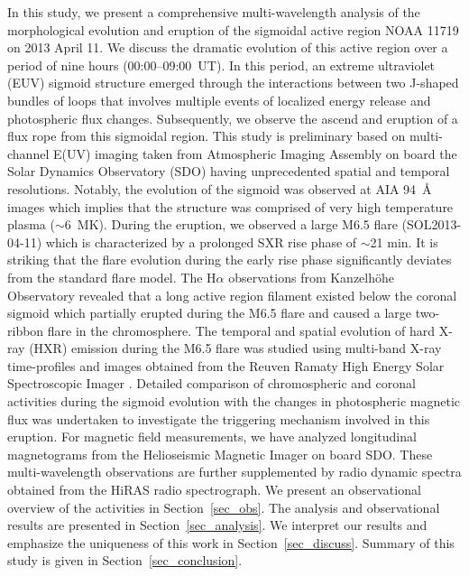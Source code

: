 \documentclass[twocolumn]{aastex6}
\begin{document}
In this study, we present a comprehensive multi-wavelength analysis of the morphological evolution and eruption of the sigmoidal active region NOAA 11719 on 2013 April 11. We discuss the dramatic evolution of this active region over a period of nine hours (00:00--09:00~UT). In this period, an extreme ultraviolet (EUV) sigmoid structure emerged through the interactions between two J-shaped bundles of loops that involves multiple events of localized energy release and photospheric flux changes. Subsequently, we observe the ascend and eruption of a flux rope from this sigmoidal region. This study is preliminary based on multi-channel E(UV) imaging taken from Atmospheric Imaging Assembly \citep[AIA;][]{Lemen2012} on board the Solar Dynamics Observatory (SDO) having unprecedented spatial and temporal resolutions. Notably, the evolution of the sigmoid was observed at AIA 94~\AA~ images which implies that the structure was comprised of very high temperature plasma ($\sim$6~MK). During the eruption, we observed a large M6.5 flare (SOL2013-04-11) which is characterized by a prolonged SXR rise phase of $\sim$21 min. It is striking that the flare evolution during the early rise phase significantly deviates from the standard flare model. The H$\alpha$ observations from Kanzelh\"{o}he Observatory \citep[KSO;][]{Potzi2015} revealed that a long active region filament existed below the coronal sigmoid which partially erupted during the M6.5 flare and caused a large two-ribbon flare in the chromosphere. The temporal and spatial evolution of hard X-ray (HXR) emission during the M6.5 flare was studied using multi-band X-ray time-profiles and images obtained from the Reuven Ramaty High Energy Solar Spectroscopic Imager \citep[RHESSI;][]{LinRP2002}. Detailed comparison of chromospheric and coronal activities during the sigmoid evolution with the changes in photospheric magnetic flux was undertaken to investigate the triggering mechanism involved in  this eruption. For magnetic field measurements, we have analyzed longitudinal magnetograms from the Helioseismic Magnetic Imager \citep[HMI;][]{Schou2012} on board SDO. These multi-wavelength observations are further supplemented by radio dynamic spectra obtained from the HiRAS radio spectrograph. We present an observational overview of the activities in Section~\ref{sec_obs}. The analysis and observational results are presented in Section~\ref{sec_analysis}. We interpret our results and emphasize the uniqueness of this work in Section~\ref{sec_discuss}. Summary of this study is given in Section~\ref{sec_conclusion}. 
\end{document}
